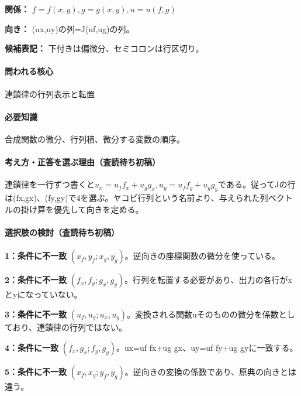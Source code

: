 \noindent\textbf{関係：} \(f=f(x,y),g=g(x,y),u=u(f,g)\)\par

\noindent\textbf{向き：} (ux,uy)の列=J(uf,ug)の列。\par

\noindent\textbf{候補表記：} 下付きは偏微分、セミコロンは行区切り。\par

\paragraph{問われる核心} 連鎖律の行列表示と転置

\paragraph{必要知識} 合成関数の微分、行列積、微分する変数の順序。

\paragraph{考え方・正答を選ぶ理由（査読待ち初稿）} 連鎖律を一行ずつ書くと\(u_x=u_ff_x+u_gg_x,u_y=u_ff_y+u_gg_y\)である。従ってJの行は(fx,gx)、(fy,gy)で4を選ぶ。ヤコビ行列という名前より、与えられた列ベクトルの掛け算を優先して向きを定める。

\paragraph{選択肢の検討（査読待ち初稿）}\mbox{}\par

\noindent\textbf{1：条件に不一致} \((x_f,y_f;x_g,y_g)\)。逆向きの座標関数の微分を使っている。\par

\noindent\textbf{2：条件に不一致} \((f_x,f_y;g_x,g_y)\)。行列を転置する必要があり、出力の各行がxとyになっていない。\par

\noindent\textbf{3：条件に不一致} \((u_f,u_g;u_x,u_y)\)。変換される関数uそのものの微分を係数としており、連鎖律の行列ではない。\par

\noindent\textbf{4：条件に一致} \((f_x,g_x;f_y,g_y)\)。ux=\allowbreak{}uf fx+ug gx、uy=\allowbreak{}uf fy+ug gyに一致する。\par

\noindent\textbf{5：条件に不一致} \((x_f,x_g;y_f,y_g)\)。逆向きの変換の係数であり、原典の向きとは違う。\par

